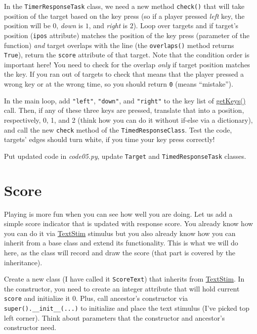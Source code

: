 \documentclass[
]{book}
\begin{document}
In the \texttt{TimerResponseTask} class, we need a new method \texttt{check()} that will take position of the target based on the key press (so if a player pressed \emph{left} key, the position will be \(0\), \emph{down} is \(1\), and \emph{right} is \(2\)). Loop over targets and if target's position (\texttt{ipos} attribute) matches the position of the key press (parameter of the function) \emph{and} target overlaps with the line (the \texttt{overlaps()} method returns \texttt{True}), return the \texttt{score} attribute of that target. Note that the condition order is important here! You need to check for the overlap \emph{only} if target position matches the key. If you ran out of targets to check that means that the player pressed a wrong key or at the wrong time, so you should return \texttt{0} (means ``mistake'').

In the main loop, add \texttt{"left"}, \texttt{"down"}, and \texttt{"right"} to the key list of \href{https://psychopy.org/api/event.html\#psychopy.event.getKeys}{getKeys()} call. Then, if any of these three keys are pressed, translate that into a position, respectively, 0, 1, and 2 (think how you can do it without if-else via a dictionary), and call the new \texttt{check} method of the \texttt{TimedResponseClass}. Test the code, targets' edges should turn white, if you time your key press correctly!

Put updated code in \emph{code05.py}, update \texttt{Target} and \texttt{TimedResponseTask} classes.

\hypertarget{score}{%
\section{Score}\label{score}}

Playing is more fun when you can see how well you are doing. Let us add a simple score indicator that is updated with response score. You already know how you can do it via \href{https://psychopy.org/api/visual/textstim.html\#psychopy.visual.TextStim}{TextStim} stimulus but you also already know how you can inherit from a base class and extend its functionality. This is what we will do here, as the class will record and draw the score (that part is covered by the inheritance).

Create a new class (I have called it \texttt{ScoreText}) that inherits from \href{https://psychopy.org/api/visual/textstim.html\#psychopy.visual.TextStim}{TextStim}. In the constructor, you need to create an integer attribute that will hold current \texttt{score} and initialize it 0. Plus, call ancestor's constructor via \texttt{super().\_\_init\_\_(...)} to initialize and place the text stimulus (I've picked top left corner). Think about parameters that the constructor and ancestor's constructor need.
\end{document}
